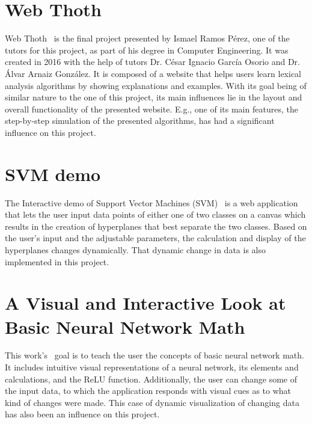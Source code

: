 
\section{Web Thoth}
Web Thoth~\cite{web_thoth} is the final project presented by Ismael Ramos Pérez, one of the tutors for this project, as part of his degree in Computer Engineering. It was created in 2016 with the help of tutors Dr. César Ignacio García Osorio and Dr. Álvar Arnaiz González. It is composed of a website that helps users learn lexical analysis algorithms by showing explanations and examples. With its goal being of similar nature to the one of this project, its main influences lie in the layout and overall functionality of the presented website. E.g., one of its main features, the step-by-step simulation of the presented algorithms, has had a significant influence on this project.

\section{SVM demo}
The Interactive demo of Support Vector Machines (SVM)~\cite{svm_demo} is a web application that lets the user input data points of either one of two classes on a canvas which results in the creation of hyperplanes that best separate the two classes. Based on the user's input and the adjustable parameters, the calculation and display of the hyperplanes changes dynamically. That dynamic change in data is also implemented in this project.

\section{A Visual and Interactive Look at Basic Neural Network Math}
This work's~\cite{neural_network_math_demo} goal is to teach the user the concepts of basic neural network math. It includes intuitive visual representations of a neural network, its elements and calculations, and the ReLU function. Additionally, the user can change some of the input data, to which the application responds with visual cues as to what kind of changes were made. This case of dynamic visualization of changing data has also been an influence on this project.